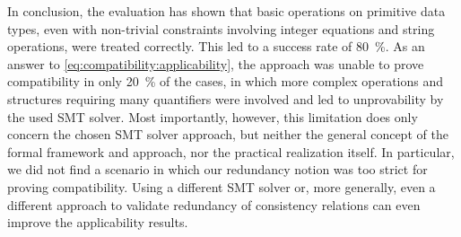
In conclusion, the evaluation has shown that basic operations on primitive data types, even with non-trivial constraints involving integer equations and string operations, were treated correctly.
This led to a success rate of \SI{80}{\percent}.
As an answer to \autoref{eq:compatibility:applicability}, the approach was unable to prove compatibility in only \SI{20}{\percent} of the cases, in which more complex operations and structures requiring many quantifiers were involved and led to unprovability by the used \gls{SMT} solver.
Most importantly, however, this limitation does only concern the chosen \gls{SMT} solver approach, but neither the general concept of the formal framework and approach, nor the practical realization itself.
In particular, we did not find a scenario in which our redundancy notion was too strict for proving compatibility.
Using a different \gls{SMT} solver or, more generally, even a different approach to validate redundancy of consistency relations can even improve the applicability results.



